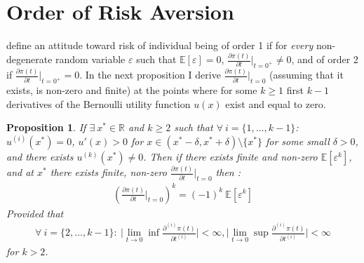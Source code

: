 \documentclass[a4paper]{article}
\newcommand{\expect}{\mathbb{E}}
\newcommand{\eps}{\varepsilon}
\newtheorem{proposition}[theorem]{Proposition}
\begin{document}
\section{Order of Risk Aversion}
\cite{segal1990first} define an attitude toward risk of individual being of order 1 if for \textit{every} non-degenerate random variable $\eps$ such that $\expect[\eps] = 0$, $\frac{\partial \pi(t)}{\partial t} \bigg|_{t = 0^+} \neq 0$, and of order 2 if $\frac{\partial \pi(t)}{\partial t} \bigg|_{t = 0^+} = 0$. 
In the next proposition I derive $\frac{\partial \pi(t)}{\partial t} \bigg|_{t = 0}$ (assuming that it exists, is non-zero and finite) at the points where for some $k\ge 1$ first $k-1$ derivatives of the Bernoulli utility function $u(x)$ exist and equal to zero.
	\begin{proposition}\label{derivative}
		If $\exists\ x^* \in \mathbb{R}$ and $k \ge 2$ such that $\forall\ i = \{1, \dots, k-1  \}$: $u^{(i)}(x^*) = 0$, $u'(x) > 0$ for $x \in (x^*-\delta, x^*+\delta)\setminus \{x^*\}$ for some small $\delta>0$, and there exists $u^{(k)}(x^*) \neq 0$. Then if there exists finite and non-zero $\expect[\eps^k]$, and at $x^*$ there exists finite, non-zero $\frac{\partial \pi(t)}{\partial t} \bigg|_{t = 0}$ then :
		\begin{align}
			\left( \frac{\partial \pi(t)}{\partial t} \bigg|_{t = 0} \right)^k = (-1)^k\ \expect[\varepsilon^k]
		\end{align}
	Provided that \begin{align}\label{limsup}
	\forall\ i = \{2,\dots, k-1\}:\ \bigg|\lim_{t\to0} \inf \frac{\partial^{(i)} \pi(t)}{\partial t^{(i)}}\bigg| < \infty, \bigg|\lim_{t\to0} \sup \frac{\partial^{(i)} \pi(t)}{\partial t^{(i)}}\bigg| < \infty
\end{align} for $k>2$.
	\end{proposition}
\end{document}
